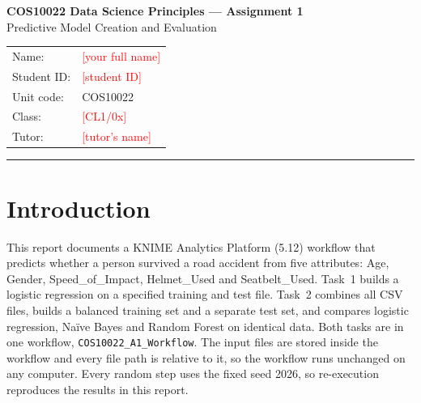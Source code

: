 \documentclass[11pt,a4paper]{article}
\newcommand{\fillin}[1]{\textcolor{Red}{[#1]}}
\newcommand{\cd}[1]{\texttt{#1}}
\begin{document}
\begin{center}
{\Large\bfseries COS10022 Data Science Principles --- Assignment 1}\\[2pt]
{\large Predictive Model Creation and Evaluation}
\end{center}
\begin{tabularx}{\linewidth}{@{}lX@{}}
Name: & \fillin{your full name}\\
Student ID: & \fillin{student ID}\\
Unit code: & COS10022\\
Class: & \fillin{CL1/0x}\\
Tutor: & \fillin{tutor's name}\\
\end{tabularx}
\vspace{2pt}\hrule

\section{Introduction}
This report documents a KNIME Analytics Platform (5.12) workflow that predicts whether a person survived a road
accident from five attributes: Age, Gender, Speed\_of\_Impact, Helmet\_Used and Seatbelt\_Used. Task~1 builds a
logistic regression on a specified training and test file. Task~2 combines all CSV files, builds a balanced training
set and a separate test set, and compares logistic regression, Naïve Bayes and Random Forest on identical data. Both
tasks are in one workflow, \cd{COS10022\_A1\_Workflow}. The input files are stored inside the workflow and every file
path is relative to it, so the workflow runs unchanged on any computer. Every random step uses the fixed seed 2026,
so re-execution reproduces the results in this report.
\end{document}
